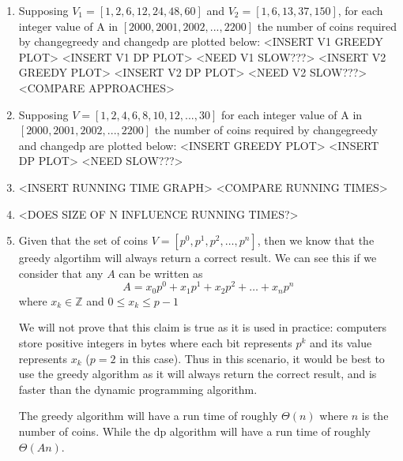 \documentclass[paper=a4, fontsize=11pt]{scrartcl} %
\numberwithin{equation}{section} %
\numberwithin{figure}{section} %
\numberwithin{table}{section} %
\begin{document}
\begin{enumerate}
    \item Supposing $V_1 = [1, 2, 6, 12, 24, 48, 60]$ and $V_2 = [1, 6, 13, 37, 150]$, for each integer value of A in $[2000, 2001, 2002, ..., 2200]$ the number of coins required by changegreedy and changedp are plotted below: <INSERT V1 GREEDY PLOT> <INSERT V1 DP PLOT> <NEED V1 SLOW???> <INSERT V2 GREEDY PLOT> <INSERT V2 DP PLOT> <NEED V2 SLOW???> <COMPARE APPROACHES>
    
    \item Supposing $V = [1, 2, 4, 6, 8, 10, 12, ..., 30]$ for each integer value of A in $[2000, 2001, 2002, ..., 2200]$ the number of coins required by changegreedy and changedp are plotted below: <INSERT GREEDY PLOT> <INSERT DP PLOT> <NEED SLOW???>
    
    \item <INSERT TREND LINE EQUATIONS AND FIND RUNTIME> <INSERT RUNNING TIME GRAPH> <COMPARE RUNNING TIMES>
    
    \item <PLOT RUNNING TIMES AS FUNCTION OF NUMBER OF DENOMINATIONS> <DOES SIZE OF N INFLUENCE RUNNING TIMES?>
    
    \item
    Given that the set of coins $V = [p^0, p^1, p^2, \ldots, p^n]$, then we know
    that the greedy algortihm will always return a correct result. We can see
    this if we consider that any $A$ can be written as 
    \[ A = x_0p^0 + x_1p^1 + x_2p^2 + \ldots + x_np^n \]
    where $x_k \in \mathbb{Z}$ and $0 \leq x_k \leq p - 1$
    
    We will not prove that this claim is true as it is used in practice: 
    computers store positive integers in bytes where each bit represents $p^k$ 
    and its value represents $x_k$ ($p = 2$ in this case). Thus in this 
    scenario, it would be best to use the greedy algorithm as it will always 
    return the correct result, and is faster than the dynamic programming 
    algorithm. 

    The greedy algorithm will have a run time of roughly $\Theta(n)$ where $n$
    is the number of coins. While the dp algorithm will have a run time of
    roughly $\Theta(An)$.
\end{enumerate}
\end{document}
